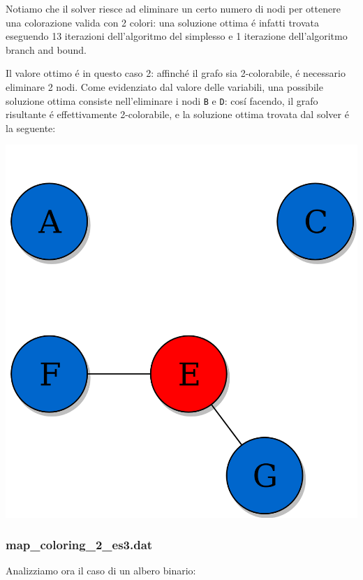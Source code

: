 \documentclass{article}
\begin{document}
Notiamo che il solver riesce ad eliminare un certo numero di nodi per ottenere una colorazione valida con 2 colori: una soluzione ottima \'e infatti trovata eseguendo 13 iterazioni dell'algoritmo del simplesso e 1 iterazione dell'algoritmo branch and bound.\\

\pagebreak

Il valore ottimo \'e in questo caso 2: affinch\'e il grafo sia 2-colorabile, \'e necessario eliminare 2 nodi. Come evidenziato dal valore delle variabili, una possibile soluzione ottima consiste nell'eliminare i nodi \texttt{B} e \texttt{D}: cos\'i facendo, il grafo risultante \'e effettivamente 2-colorabile, e la soluzione ottima trovata dal solver \'e la seguente:\\

\begin{center}
\includegraphics[scale=0.15]{non_complete_graph_coloured2.png}
\end{center}

\pagebreak

\subsubsection{map\_coloring\_2\_es3.dat}
Analizziamo ora il caso di un albero binario:\\
\end{document}

